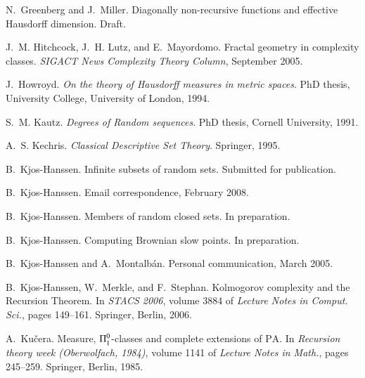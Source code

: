 \documentclass[11pt,reqno]{article}
\theoremstyle{plain}
\theoremstyle{definition}
\theoremstyle{remark}
\numberwithin{equation}{section}
\begin{document}
\begin{thebibliography}{41}
N.~Greenberg and J.~Miller.
\newblock Diagonally non-recursive functions and effective Hausdorff dimension.
\newblock Draft.

J.~M. Hitchcock, J.~H. Lutz, and E.~Mayordomo.
\newblock Fractal geometry in complexity classes.
\newblock \emph{SIGACT News Complexity Theory Column}, September 2005.

J.~Howroyd.
\newblock \emph{On the theory of Hausdorff measures in metric spaces}.
\newblock PhD thesis, University College, University of London, 1994.

S.~M. Kautz.
\newblock \emph{Degrees of Random sequences}.
\newblock PhD thesis, Cornell University, 1991.

A.~S. Kechris.
\newblock \emph{Classical Descriptive Set Theory}.
\newblock Springer, 1995.

B.~Kjos-Hanssen.
\newblock Infinite subsets of random sets.
\newblock Submitted for publication.

B.~Kjos-Hanssen.
\newblock Email correspondence, February 2008{}.

B.~Kjos-Hanssen.
\newblock Members of random closed sets.
\newblock In preparation.

B.~Kjos-Hanssen.
\newblock Computing Brownian slow points.
\newblock In preparation.

B.~Kjos-Hanssen and A.~Montalb{\'a}n.
\newblock Personal communication, March 2005.

B.~Kjos-Hanssen, W.~Merkle, and F.~Stephan.
\newblock Kolmogorov complexity and the Recursion Theorem.
\newblock In \emph{STACS 2006}, volume 3884 of \emph{Lecture Notes in Comput.
  Sci.}, pages 149--161. Springer, Berlin, 2006.

A.~Ku{\v{c}}era.
\newblock Measure, {$\Pi\sp 0\sb 1$}-classes and complete extensions of
  {$\mathrm{PA}$}.
\newblock In \emph{Recursion theory week (Oberwolfach, 1984)}, volume 1141 of
  \emph{Lecture Notes in Math.}, pages 245--259. Springer, Berlin, 1985.


\end{thebibliography}
\end{document}
